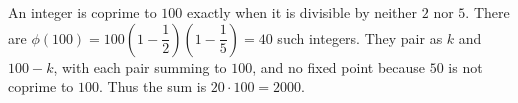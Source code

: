 An integer is coprime to $100$ exactly when it is divisible by neither $2$ nor $5$. There are $\phi(100)=100(1-\dfrac{1}{2})(1-\dfrac{1}{5})=40$ such integers. They pair as $k$ and $100-k$, with each pair summing to $100$, and no fixed point because $50$ is not coprime to $100$. Thus the sum is $20\cdot100=\boxed{2000}$.
